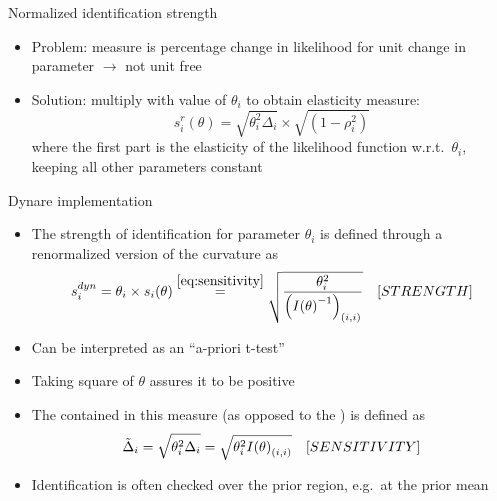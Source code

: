 \documentclass[handout,usepdftitle=false,xcolor=dvipsnames,aspectratio=169]{beamer}
\begin{document}
\begin{frame}{Normalized identification strength}
  \begin{itemize}
    \item Problem: measure is percentage change in likelihood for unit change in parameter $\rightarrow$ not unit free
    \item Solution: multiply with value of $\theta_i$ to obtain elasticity measure:
          \begin{equation}
            s_i^r\left( \theta  \right) = \sqrt {{\theta^2_i}{\Delta _i}}  \times \sqrt {\left( {1 - \rho _i^2} \right)}
          \end{equation}
          where the first part is the elasticity of the likelihood function w.r.t.\ $\theta_i$, keeping all other parameters constant
  \end{itemize}
\end{frame}

\renewcommand{\Source}{\textcite{RattoIskrev2011}}

\begin{frame}{Dynare implementation}
  \begin{itemize}
    \item The strength of identification for parameter $\theta_i$ is defined through a renormalized version of the curvature as
          \begin{equation}
            {s_i^{dyn}} = \theta _i \times s_i(\theta)\overset{\eqref{eq:sensitivity}}{=}\sqrt {\frac{{\theta _i^2}}{{{{\left( {I{{\left( \theta  \right)}^{ - 1}}} \right)}_{\left( {i,i} \right)}}}}} \quad \text[STRENGTH]
          \end{equation}
    \item Can be interpreted as an ``a-priori t-test''
    \item Taking square of $\theta$ assures it to be positive
    \item The  contained in this measure (as opposed to the ) is defined as
          \begin{equation}
            {\tilde\Delta _i} =\sqrt {{\theta _i^2}{\Delta _i}}= \sqrt {\theta _i^2I{{\left( \theta  \right)}_{\left( {i,i} \right)}}} \quad \text[SENSITIVITY]
          \end{equation}
    \item Identification is often checked over the prior region, e.g.\ at the prior mean
  \end{itemize}
\end{frame}
\end{document}

